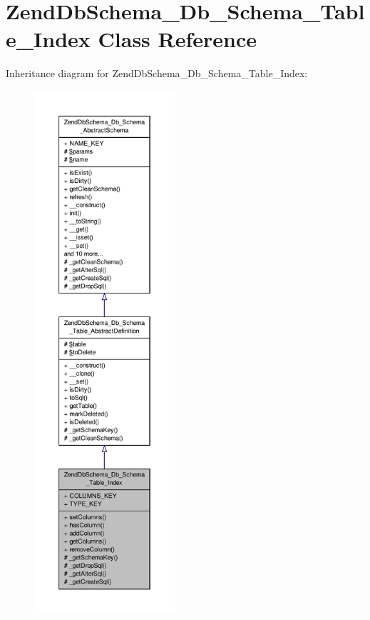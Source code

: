 \hypertarget{classZendDbSchema__Db__Schema__Table__Index}{\section{Zend\-Db\-Schema\-\_\-\-Db\-\_\-\-Schema\-\_\-\-Table\-\_\-\-Index Class Reference}
\label{classZendDbSchema__Db__Schema__Table__Index}
}


Inheritance diagram for Zend\-Db\-Schema\-\_\-\-Db\-\_\-\-Schema\-\_\-\-Table\-\_\-\-Index\-:\nopagebreak
\begin{figure}[H]
\begin{center}
\leavevmode
\includegraphics[height=550pt]{classZendDbSchema__Db__Schema__Table__Index__inherit__graph}
\end{center}
\end{figure}


